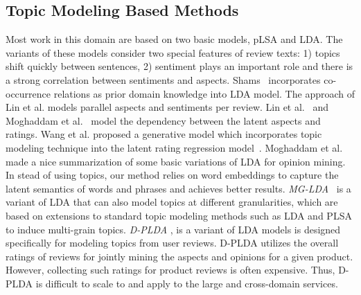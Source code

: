 \subsection{Topic Modeling Based Methods}
Most work in this domain are based on two basic models, 
pLSA\cite{hofmann1999probabilistic} and LDA\cite{Blei2003LatentDA}. 
The variants of these models consider two special features of review texts:
1) topics shift quickly between sentences,
2) sentiment plays an important role and there is a strong 
correlation between sentiments and aspects. 
Shams~\cite{shams2017enriched} incorporates co-occurrence relations as prior domain knowledge into LDA model.
The approach of Lin et al. \cite{lakkaraju2011exploiting} models 
parallel aspects and sentiments per review. 
Lin et al.~\cite{lin2009joint} and Moghaddam et al.~\cite{moghaddam2011ilda} model the dependency between 
the latent aspects and ratings. 
Wang et al. \cite{wang2011latent} proposed 
a generative model which incorporates topic modeling technique 
into the latent rating regression model~\cite{wang2010latent}.
Moghaddam et al. \cite{moghaddam2012design} made a nice 
summarization of some basic variations of LDA for opinion mining.
In stead of using topics, our method relies on word embeddings to capture
the latent semantics of words and phrases and achieves better results.
\emph{MG-LDA}~\cite{titov2008modeling} is a variant of LDA that can also model topics at different granularities, which are based on extensions to standard topic modeling methods such as LDA and PLSA to induce multi-grain topics. 
\emph{D-PLDA} \cite{moghaddam2012design}, 
is a variant of LDA models is designed specifically for modeling topics from user reviews.  
D-PLDA utilizes the overall ratings of reviews for jointly 
mining the aspects and opinions for a given product.
However,  collecting such ratings for product reviews is often expensive.  
Thus, D-PLDA is difficult to scale to and apply to the large
and cross-domain services.

